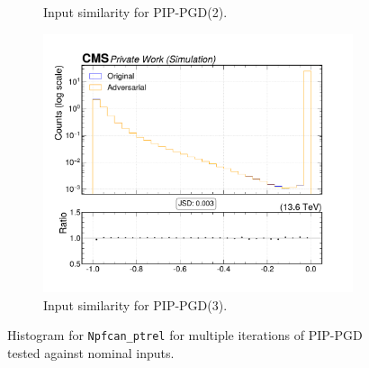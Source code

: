 \begin{figure}[htbp]
\begin{subfigure}[t]{0.32\textwidth}
    \caption*{Input similarity for PIP-PGD(2).}
  \end{subfigure}\hfill
  \begin{subfigure}[t]{0.32\textwidth}
    \includegraphics[width=\linewidth]{media/output/features/compare/combined_it_3/cmp_npf_arr_Npfcan_ptrel.pdf}
    \caption*{Input similarity for PIP-PGD(3).}
  \end{subfigure}

  \caption*{Histogram for \texttt{Npfcan\_ptrel} for multiple iterations of PIP-PGD tested against nominal inputs.}
  \label{fig:combined_input_Npfcan_ptrel}
\end{figure}


